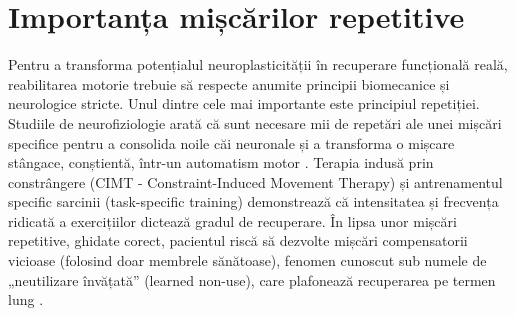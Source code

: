 \section{Importanța mișcărilor repetitive}
\hspace{0.75cm}Pentru a transforma potențialul neuroplasticității în recuperare funcțională reală, reabilitarea motorie trebuie să respecte 
anumite principii biomecanice și neurologice stricte. Unul dintre cele mai importante este principiul repetiției. Studiile de neurofiziologie 
arată că sunt necesare mii de repetări ale unei mișcări specifice pentru a consolida noile căi neuronale și a transforma o mișcare stângace, 
conștientă, într-un automatism motor \cite{lang_2009}. Terapia indusă prin constrângere (CIMT - Constraint-Induced Movement Therapy) 
și antrenamentul specific sarcinii (task-specific training) demonstrează că intensitatea și frecvența ridicată a exercițiilor dictează 
gradul de recuperare. În lipsa unor mișcări repetitive, ghidate corect, pacientul riscă să dezvolte mișcări compensatorii vicioase 
(folosind doar membrele sănătoase), 
fenomen cunoscut sub numele de „neutilizare învățată” (learned non-use), care plafonează recuperarea pe termen lung \cite{taub_2014}.
